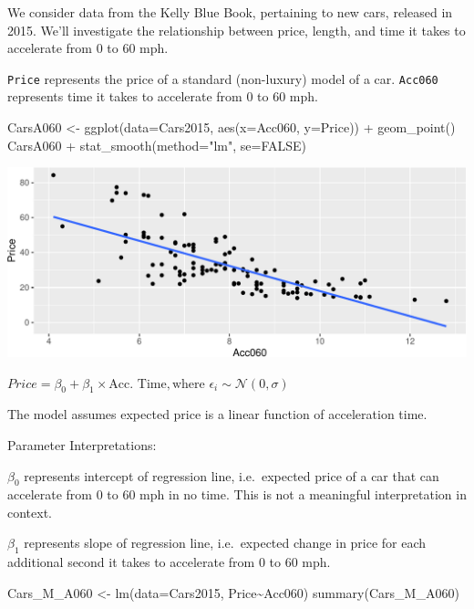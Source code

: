\documentclass[
  letterpaper,
  DIV=11,
  numbers=noendperiod]{scrreprt}
\newenvironment{Shaded}{\begin{snugshade}}{\end{snugshade}}
\newcommand{\AttributeTok}[1]{\textcolor[rgb]{0.40,0.45,0.13}{#1}}
\newcommand{\ConstantTok}[1]{\textcolor[rgb]{0.56,0.35,0.01}{#1}}
\newcommand{\FunctionTok}[1]{\textcolor[rgb]{0.28,0.35,0.67}{#1}}
\newcommand{\NormalTok}[1]{\textcolor[rgb]{0.00,0.23,0.31}{#1}}
\newcommand{\OtherTok}[1]{\textcolor[rgb]{0.00,0.23,0.31}{#1}}
\newcommand{\SpecialCharTok}[1]{\textcolor[rgb]{0.37,0.37,0.37}{#1}}
\newcommand{\StringTok}[1]{\textcolor[rgb]{0.13,0.47,0.30}{#1}}
\begin{document}
We consider data from the Kelly Blue Book, pertaining to new cars,
released in 2015. We'll investigate the relationship between price,
length, and time it takes to accelerate from 0 to 60 mph.

\texttt{Price} represents the price of a standard (non-luxury) model of
a car. \texttt{Acc060} represents time it takes to accelerate from 0 to
60 mph.

\begin{Shaded}
\begin{Highlighting}[]
\NormalTok{CarsA060 }\OtherTok{\textless{}{-}} \FunctionTok{ggplot}\NormalTok{(}\AttributeTok{data=}\NormalTok{Cars2015, }\FunctionTok{aes}\NormalTok{(}\AttributeTok{x=}\NormalTok{Acc060, }\AttributeTok{y=}\NormalTok{Price)) }\SpecialCharTok{+} \FunctionTok{geom\_point}\NormalTok{() }
\NormalTok{CarsA060 }\SpecialCharTok{+} \FunctionTok{stat\_smooth}\NormalTok{(}\AttributeTok{method=}\StringTok{"lm"}\NormalTok{, }\AttributeTok{se=}\ConstantTok{FALSE}\NormalTok{)}
\end{Highlighting}
\end{Shaded}

\includegraphics{Ch4_files/figure-pdf/unnamed-chunk-81-1.pdf}

\(Price = \beta_0 + \beta_1\times\text{Acc. Time} , \text{where } \epsilon_i\sim\mathcal{N}(0, \sigma)\)

The model assumes expected price is a linear function of acceleration
time.

Parameter Interpretations:

\(\beta_0\) represents intercept of regression line, i.e.~expected price
of a car that can accelerate from 0 to 60 mph in no time. This is not a
meaningful interpretation in context.

\(\beta_1\) represents slope of regression line, i.e.~expected change in
price for each additional second it takes to accelerate from 0 to 60
mph.

\begin{Shaded}
\begin{Highlighting}[]
\NormalTok{Cars\_M\_A060 }\OtherTok{\textless{}{-}} \FunctionTok{lm}\NormalTok{(}\AttributeTok{data=}\NormalTok{Cars2015, Price}\SpecialCharTok{\textasciitilde{}}\NormalTok{Acc060)}
\FunctionTok{summary}\NormalTok{(Cars\_M\_A060)}
\end{Highlighting}
\end{Shaded}
\end{document}
